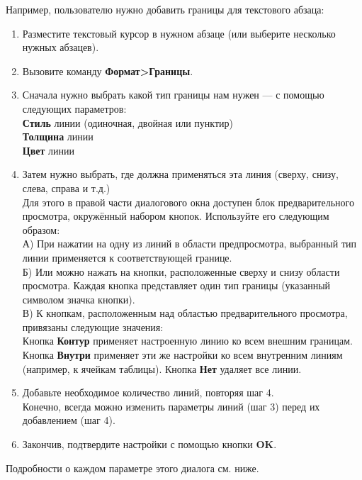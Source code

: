 ﻿\documentclass[a4paper,10pt]{article}
\begin{document}
Например, пользователю нужно добавить границы для текстового абзаца:
\begin{enumerate}
 \item Разместите текстовый курсор в нужном абзаце (или выберите несколько нужных абзацев).
 \item Вызовите команду \textbf{Формат>Границы}. 
 \item Сначала нужно выбрать какой тип границы нам нужен — с помощью следующих параметров:\\
\textbf{Стиль} линии (одиночная, двойная или пунктир)\\
\textbf{Толщина} линии\\
\textbf{Цвет} линии
\item Затем нужно выбрать, где должна применяться эта линия (сверху, снизу, слева, справа и т.д.)\\
Для этого в правой части диалогового окна доступен блок предварительного просмотра, окружённый набором кнопок. Используйте его следующим образом:\\
А) При нажатии на одну из линий в области предпросмотра, выбранный тип линии применяется к соответствующей границе.\\
Б) Или можно нажать на кнопки, расположенные сверху и снизу области просмотра. Каждая кнопка представляет один тип границы (указанный символом значка кнопки).\\
В) К кнопкам, расположенным над областью предварительного просмотра, привязаны следующие значения:\\
Кнопка \textbf{Контур} применяет настроенную линию ко всем внешним границам.
Кнопка \textbf{Внутри} применяет эти же настройки ко всем внутренним линиям (например, к ячейкам таблицы).
Кнопка \textbf{Нет} удаляет все линии.
\item Добавьте необходимое количество линий, повторяя шаг 4.\\ 
Конечно, всегда можно изменить параметры линий (шаг 3) перед их добавлением (шаг 4).
\item Закончив, подтвердите настройки с помощью кнопки \textbf{OK}.
\end{enumerate}

Подробности о каждом параметре этого диалога см. ниже.
\end{document}
